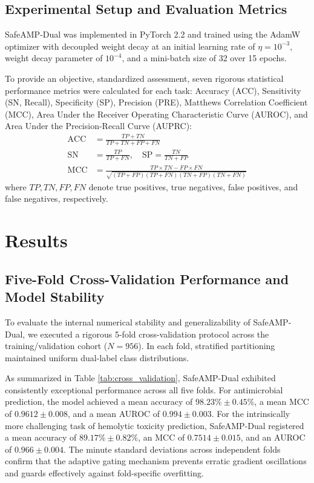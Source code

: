 \documentclass[11pt,a4paper]{article}
\begin{document}
\subsection{Experimental Setup and Evaluation Metrics}
SafeAMP-Dual was implemented in PyTorch 2.2 \cite{paszke2019pytorch} and trained using the AdamW optimizer with decoupled weight decay \cite{kingma2015adam, loshchilov2019decoupled} at an initial learning rate of $\eta = 10^{-3}$, weight decay parameter of $10^{-4}$, and a mini-batch size of 32 over 15 epochs. 

To provide an objective, standardized assessment, seven rigorous statistical performance metrics were calculated for each task: Accuracy (ACC), Sensitivity (SN, Recall), Specificity (SP), Precision (PRE), Matthews Correlation Coefficient (MCC), Area Under the Receiver Operating Characteristic Curve (AUROC), and Area Under the Precision-Recall Curve (AUPRC):
\begin{align}
    \text{ACC} &= \frac{TP + TN}{TP + TN + FP + FN} \\
    \text{SN} &= \frac{TP}{TP + FN}, \quad \text{SP} = \frac{TN}{TN + FP} \\
    \text{MCC} &= \frac{TP \times TN - FP \times FN}{\sqrt{(TP + FP)(TP + FN)(TN + FP)(TN + FN)}}
\end{align}
where $TP, TN, FP, FN$ denote true positives, true negatives, false positives, and false negatives, respectively.

\newpage

\section{Results}

\subsection{Five-Fold Cross-Validation Performance and Model Stability}
To evaluate the internal numerical stability and generalizability of SafeAMP-Dual, we executed a rigorous 5-fold cross-validation protocol across the training/validation cohort ($N = 956$). In each fold, stratified partitioning maintained uniform dual-label class distributions. 

As summarized in Table \ref{tab:cross_validation}, SafeAMP-Dual exhibited consistently exceptional performance across all five folds. For antimicrobial prediction, the model achieved a mean accuracy of $98.23\% \pm 0.45\%$, a mean MCC of $0.9612 \pm 0.008$, and a mean AUROC of $0.994 \pm 0.003$. For the intrinsically more challenging task of hemolytic toxicity prediction, SafeAMP-Dual registered a mean accuracy of $89.17\% \pm 0.82\%$, an MCC of $0.7514 \pm 0.015$, and an AUROC of $0.966 \pm 0.004$. The minute standard deviations across independent folds confirm that the adaptive gating mechanism prevents erratic gradient oscillations and guards effectively against fold-specific overfitting.
\end{document}
